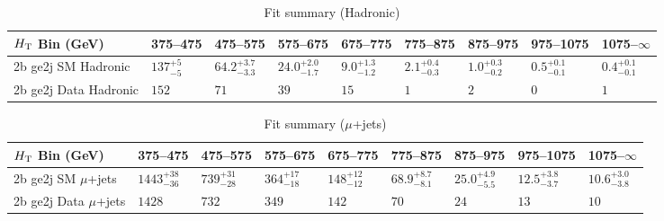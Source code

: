 \documentclass[8pt]{article}
\def\scalht{\mbox{$H_{\rm{T}}$}\xspace}
\newcommand\T{\rule{0pt}{2.6ex}}
\begin{document}
\begin{table}[ht!]
\caption{Fit summary (Hadronic)}
\label{tab:ensemble-summary}
\centering
\begin{tabular}{ lllllllll }

\hline
\scalht Bin (GeV)       & 375--475                       & 475--575                       & 575--675                       & 675--775                       & 775--875                       & 875--975                       & 975--1075                      & 1075--$\infty$                 \\ [1.000000ex]
\hline
2b ge2j SM Hadronic\T   & $137^{+5}_{-5}$                & $64.2^{+3.7}_{-3.3}$           & $24.0^{+2.0}_{-1.7}$           & $9.0^{+1.3}_{-1.2}$            & $2.1^{+0.4}_{-0.3}$            & $1.0^{+0.3}_{-0.2}$            & $0.5^{+0.1}_{-0.1}$            & $0.4^{+0.1}_{-0.1}$            \\ 
2b ge2j Data Hadronic\T & $152$                          & $71$                           & $39$                           & $15$                           & $1$                            & $2$                            & $0$                            & $1$                            \\ 
\hline

\end{tabular}
\end{table}
\begin{table}[ht!]
\caption{Fit summary ($\mu$+jets)}
\label{tab:ensemble-summary}
\centering
\begin{tabular}{ lllllllll }

\hline
\scalht Bin (GeV)       & 375--475                       & 475--575                       & 575--675                       & 675--775                       & 775--875                       & 875--975                       & 975--1075                      & 1075--$\infty$                 \\ [1.000000ex]
\hline
2b ge2j SM $\mu$+jets\T & $1443^{+38}_{-36}$             & $739^{+31}_{-28}$              & $364^{+17}_{-18}$              & $148^{+12}_{-12}$              & $68.9^{+8.7}_{-8.1}$           & $25.0^{+4.9}_{-5.5}$           & $12.5^{+3.8}_{-3.7}$           & $10.6^{+3.0}_{-3.8}$           \\ 
2b ge2j Data $\mu$+jets\T & $1428$                         & $732$                          & $349$                          & $142$                          & $70$                           & $24$                           & $13$                           & $10$                           \\ 
\hline

\end{tabular}
\end{table}
\end{document}
